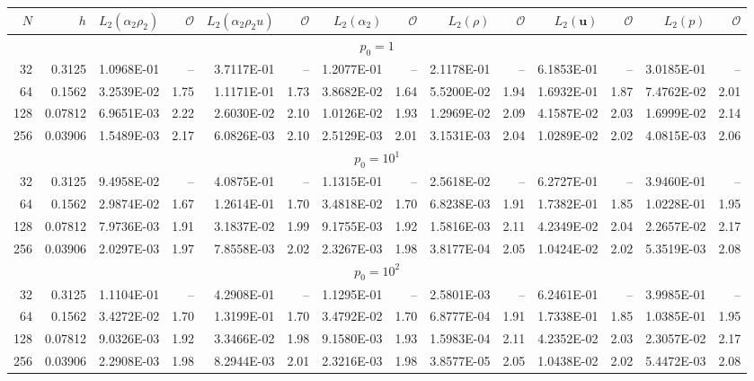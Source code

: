 \begin{tabular}{rrrrrrrrrrrrrr}
\hline
$N$ & $h$ & $L_2(\alpha_2\rho_2)$ & $\mathcal{O}$ & $L_2(\alpha_2\rho_2u)$ & $\mathcal{O}$ & $L_2(\alpha_2)$ & $\mathcal{O}$ & $L_2(\rho)$ & $\mathcal{O}$ & $L_2(\mathbf{u})$ & $\mathcal{O}$ & $L_2(p)$ & $\mathcal{O}$ \\
\hline
\multicolumn{14}{c}{$p_0=1$} \\
32 & 0.3125 & 1.0968E-01 & -- & 3.7117E-01 & -- & 1.2077E-01 & -- & 2.1178E-01 & -- & 6.1853E-01 & -- & 3.0185E-01 & -- \\
64 & 0.1562 & 3.2539E-02 & 1.75 & 1.1171E-01 & 1.73 & 3.8682E-02 & 1.64 & 5.5200E-02 & 1.94 & 1.6932E-01 & 1.87 & 7.4762E-02 & 2.01 \\
128 & 0.07812 & 6.9651E-03 & 2.22 & 2.6030E-02 & 2.10 & 1.0126E-02 & 1.93 & 1.2969E-02 & 2.09 & 4.1587E-02 & 2.03 & 1.6999E-02 & 2.14 \\
256 & 0.03906 & 1.5489E-03 & 2.17 & 6.0826E-03 & 2.10 & 2.5129E-03 & 2.01 & 3.1531E-03 & 2.04 & 1.0289E-02 & 2.02 & 4.0815E-03 & 2.06 \\
\multicolumn{14}{c}{$p_0=10^{1}$} \\
32 & 0.3125 & 9.4958E-02 & -- & 4.0875E-01 & -- & 1.1315E-01 & -- & 2.5618E-02 & -- & 6.2727E-01 & -- & 3.9460E-01 & -- \\
64 & 0.1562 & 2.9874E-02 & 1.67 & 1.2614E-01 & 1.70 & 3.4818E-02 & 1.70 & 6.8238E-03 & 1.91 & 1.7382E-01 & 1.85 & 1.0228E-01 & 1.95 \\
128 & 0.07812 & 7.9736E-03 & 1.91 & 3.1837E-02 & 1.99 & 9.1755E-03 & 1.92 & 1.5816E-03 & 2.11 & 4.2349E-02 & 2.04 & 2.2657E-02 & 2.17 \\
256 & 0.03906 & 2.0297E-03 & 1.97 & 7.8558E-03 & 2.02 & 2.3267E-03 & 1.98 & 3.8177E-04 & 2.05 & 1.0424E-02 & 2.02 & 5.3519E-03 & 2.08 \\
\multicolumn{14}{c}{$p_0=10^{2}$} \\
32 & 0.3125 & 1.1104E-01 & -- & 4.2908E-01 & -- & 1.1295E-01 & -- & 2.5801E-03 & -- & 6.2461E-01 & -- & 3.9985E-01 & -- \\
64 & 0.1562 & 3.4272E-02 & 1.70 & 1.3199E-01 & 1.70 & 3.4792E-02 & 1.70 & 6.8777E-04 & 1.91 & 1.7338E-01 & 1.85 & 1.0385E-01 & 1.95 \\
128 & 0.07812 & 9.0326E-03 & 1.92 & 3.3466E-02 & 1.98 & 9.1580E-03 & 1.93 & 1.5983E-04 & 2.11 & 4.2352E-02 & 2.03 & 2.3057E-02 & 2.17 \\
256 & 0.03906 & 2.2908E-03 & 1.98 & 8.2944E-03 & 2.01 & 2.3216E-03 & 1.98 & 3.8577E-05 & 2.05 & 1.0438E-02 & 2.02 & 5.4472E-03 & 2.08 \\

\end{tabular}
